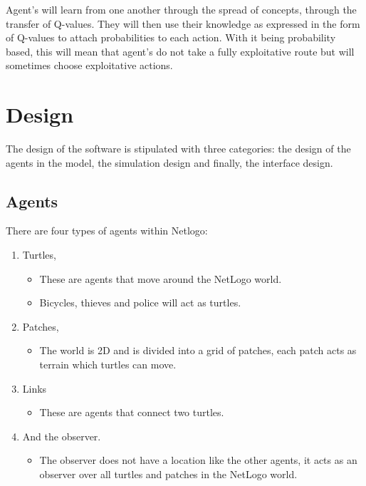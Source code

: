 \documentclass[11pt]{informatics-report}
\begin{document}
Agent's will learn from one another through the spread of concepts, through the transfer of Q-values. They will then use their knowledge as expressed in the form of Q-values to attach probabilities to each action. With it being probability based, this will mean that agent's  do not take a fully exploitative route but will sometimes choose exploitative actions.

\chapter{Design}
The design of the software is stipulated with three categories: the design of the agents in the model, the simulation design and finally, the interface design.

\section{Agents}
There are four types of agents within Netlogo:
\begin{enumerate}
\item Turtles,
\begin{itemize}
\item These are agents that move around the NetLogo world.
\item Bicycles, thieves and police will act as turtles.
\end{itemize}
\item Patches,
\begin{itemize}
\item The world is 2D and is divided into a grid of patches, each patch acts as terrain which turtles can move.
\end{itemize}
\item Links
\begin{itemize}
\item These are agents that connect two turtles.
\end{itemize}
\item And the observer.
\begin{itemize}
\item The observer does not have a location like the other agents, it acts as an observer over all turtles and patches in the NetLogo world.
\end{itemize}
\end{enumerate}
\end{document}
